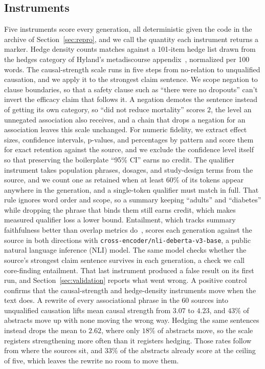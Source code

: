 \documentclass{article}
\begin{document}
\subsection{Instruments}

Five instruments score every generation, all deterministic given the code in the archive of Section~\ref{sec:repro}, and we call the quantity each instrument returns a marker. Hedge density counts matches against a 101-item hedge list drawn from the hedges category of Hyland's metadiscourse appendix~\citep{hyland2005metadiscourse}, normalized per 100 words. The causal-strength scale runs in five steps from no-relation to unqualified causation, and we apply it to the strongest claim sentence. We scope negation to clause boundaries, so that a safety clause such as ``there were no dropouts'' can't invert the efficacy claim that follows it. A negation demotes the sentence instead of getting its own category, so ``did not reduce mortality'' scores $2$, the level an unnegated association also receives, and a chain that drops a negation for an association leaves this scale unchanged. For numeric fidelity, we extract effect sizes, confidence intervals, p-values, and percentages by pattern and score them for exact retention against the source, and we exclude the confidence level itself so that preserving the boilerplate ``95\% CI'' earns no credit. The qualifier instrument takes population phrases, dosages, and study-design terms from the source, and we count one as retained when at least $60\%$ of its tokens appear anywhere in the generation, and a single-token qualifier must match in full. That rule ignores word order and scope, so a summary keeping ``adults'' and ``diabetes'' while dropping the phrase that binds them still earns credit, which makes measured qualifier loss a lower bound. Entailment, which tracks summary faithfulness better than overlap metrics do~\citep{maynez2020faithfulness}, scores each generation against the source in both directions with \texttt{cross-encoder/nli-deberta-v3-base}, a public natural language inference (NLI) model. The same model checks whether the source's strongest claim sentence survives in each generation, a check we call core-finding entailment. That last instrument produced a false result on its first run, and Section~\ref{sec:validation} reports what went wrong. A positive control confirms that the causal-strength and hedge-density instruments move when the text does. A rewrite of every associational phrase in the 60 sources into unqualified causation lifts mean causal strength from $3.07$ to $4.23$, and $43\%$ of abstracts move up with none moving the wrong way. Hedging the same sentences instead drops the mean to $2.62$, where only $18\%$ of abstracts move, so the scale registers strengthening more often than it registers hedging. Those rates follow from where the sources sit, and $33\%$ of the abstracts already score at the ceiling of five, which leaves the rewrite no room to move them.
\end{document}
